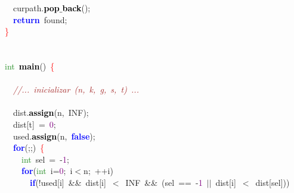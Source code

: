{{\mbox{}\ \ curpath\textcolor{BrickRed}{.}\textbf{\textcolor{Black}{pop$\_$back}}\textcolor{BrickRed}{();} \\
\mbox{}\ \ \textbf{\textcolor{Blue}{return}}\ found\textcolor{BrickRed}{;} \\
\mbox{}\textcolor{Red}{\}} \\
\mbox{} \\
\mbox{} \\
\mbox{}\textcolor{ForestGreen}{int}\ \textbf{\textcolor{Black}{main}}\textcolor{BrickRed}{()}\ \textcolor{Red}{\{} \\
\mbox{} \\
\mbox{}\ \ \textit{\textcolor{Brown}{//...\ inicializar\ (n,\ k,\ g,\ s,\ t)\ ...}} \\
\mbox{} \\
\mbox{}\ \ dist\textcolor{BrickRed}{.}\textbf{\textcolor{Black}{assign}}\textcolor{BrickRed}{(}n\textcolor{BrickRed}{,}\ INF\textcolor{BrickRed}{);} \\
\mbox{}\ \ dist\textcolor{BrickRed}{[}t\textcolor{BrickRed}{]}\ \textcolor{BrickRed}{=}\ \textcolor{Purple}{0}\textcolor{BrickRed}{;} \\
\mbox{}\ \ used\textcolor{BrickRed}{.}\textbf{\textcolor{Black}{assign}}\textcolor{BrickRed}{(}n\textcolor{BrickRed}{,}\ \textbf{\textcolor{Blue}{false}}\textcolor{BrickRed}{);} \\
\mbox{}\ \ \textbf{\textcolor{Blue}{for}}\textcolor{BrickRed}{(;;)}\ \textcolor{Red}{\{} \\
\mbox{}\ \ \ \ \textcolor{ForestGreen}{int}\ sel\ \textcolor{BrickRed}{=}\ \textcolor{BrickRed}{-}\textcolor{Purple}{1}\textcolor{BrickRed}{;} \\
\mbox{}\ \ \ \ \textbf{\textcolor{Blue}{for}}\textcolor{BrickRed}{(}\textcolor{ForestGreen}{int}\ i\textcolor{BrickRed}{=}\textcolor{Purple}{0}\textcolor{BrickRed}{;}\ i\textcolor{BrickRed}{$<$}n\textcolor{BrickRed}{;}\ \textcolor{BrickRed}{++}i\textcolor{BrickRed}{)} \\
\mbox{}\ \ \ \ \ \ \textbf{\textcolor{Blue}{if}}\textcolor{BrickRed}{(!}used\textcolor{BrickRed}{[}i\textcolor{BrickRed}{]}\ \textcolor{BrickRed}{\&\&}\ dist\textcolor{BrickRed}{[}i\textcolor{BrickRed}{]}\ \textcolor{BrickRed}{$<$}\ INF\ \textcolor{BrickRed}{\&\&}\ \textcolor{BrickRed}{(}sel\ \textcolor{BrickRed}{==}\ \textcolor{BrickRed}{-}\textcolor{Purple}{1}\ \textcolor{BrickRed}{$|$$|$}\ dist\textcolor{BrickRed}{[}i\textcolor{BrickRed}{]}\ \textcolor{BrickRed}{$<$}\ dist\textcolor{BrickRed}{[}sel\textcolor{BrickRed}{]))} \\
}}
